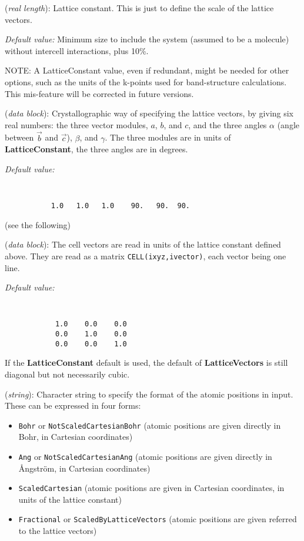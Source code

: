 \documentclass[11pt]{article}
\begin{document}
\begin{description}
\itemsep 10pt
\parsep 0pt
\item[{\bf LatticeConstant}] ({\it real length}):
Lattice constant. This is just to define the scale of the lattice vectors.

{\it Default value:} Minimum size to include the system (assumed to be a
molecule) without intercell interactions, plus 10\%.

NOTE: A LatticeConstant value, even if redundant, might be needed for
other options, such as the units of the k-points used for
band-structure calculations. This mis-feature will be corrected in
future versions.

\item[{\bf LatticeParameters}] ({\it data block}):
Crystallographic way of specifying the lattice vectors, by giving
six real numbers: the three vector modules, $a$, $b$, and $c$, and
the three angles $\alpha$ (angle between $\vec b$ and $\vec c$),
$\beta$, and $\gamma$. The three modules are in units of
{\bf LatticeConstant}, the three angles are in degrees.

{\it Default value:}
{\tt
\begin{verbatim}
           1.0   1.0   1.0    90.   90.  90.
\end{verbatim}
}
\noindent
(see the following)

\item[{\bf LatticeVectors}] ({\it data block}):
The cell vectors are read in units of the lattice constant defined above.
They are read as a matrix {\tt CELL(ixyz,ivector)}, each vector being
one line.

{\it Default value:}
{\tt
\begin{verbatim}
            1.0    0.0    0.0
            0.0    1.0    0.0
            0.0    0.0    1.0
\end{verbatim}
}
\noindent
If the {\bf LatticeConstant} default is used, the default of
{\bf LatticeVectors} is still diagonal but not necessarily cubic.


\item[{\bf AtomicCoordinatesFormat}] ({\it string}):
Character string to specify the format of the atomic positions in
input. These can be expressed in four forms:
\begin{itemize}
\item {\tt Bohr} or {\tt NotScaledCartesianBohr} (atomic positions
are given directly in Bohr, in Cartesian coordinates)
\item {\tt Ang} or {\tt NotScaledCartesianAng} (atomic positions
are given directly in {\AA}ngstr\"om, in Cartesian coordinates)
\item {\tt ScaledCartesian} (atomic positions are given
in Cartesian coordinates, in units of the lattice constant)
\item {\tt Fractional} or {\tt ScaledByLatticeVectors} (atomic positions
are given referred to the lattice vectors)
\end{itemize}


\end{description}
\end{document}
